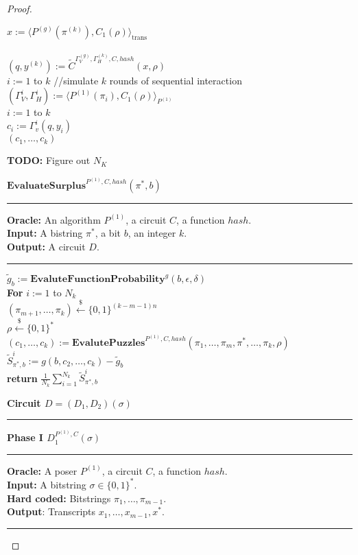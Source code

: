 \begin{proof}
\begin{codeblock}
  \IndI $x := \langle P^{(g)}(\pi^{(k)}), C_1(\rho) \rangle_{\text{trans}}$ \\ \\
  $(q,y^{(k)}) := \widetilde{C}^{\Gamma_V^{(g)}, \Gamma_H^{(k)}, C, hash}(x, \rho)$\\
  \For $i:=1$ to $k$ \Do \IndII //simulate $k$ rounds of sequential interaction \\
  \IndI $(\Gamma_V^{i}, \Gamma_H^{i}) := \langle P^{(1)}(\pi_i), C_1(\rho) \rangle_{P^{(1)}} $\\
  \For $i:=1$ to $k$ \Do \\
  \IndI $c_i := \Gamma_v^{i}(q, y_i)$\\
  \return $(c_1, \dots, c_k)$
\end{codeblock}
%
\begin{todo}
  \textbf{TODO:} Figure out $N_K$\\
\end{todo}
%
\begin{codeblock}
  $\textbf{EvaluateSurplus}^{P^{(1)}, C, hash}(\pi^*, b)$
  \medskip
  \hrule
  \medskip
  \textbf{Oracle:} An algorithm $P^{(1)}$, a circuit $C$, a function $hash$.\\
  \textbf{Input:} A bistring $\pi^*$, a bit $b$, an integer $k$.\\
  \textbf{Output:} A circuit $D$.
  \medskip\hrule\medskip
  $\widetilde{g}_b := \textbf{EvaluteFunctionProbability}^{g}(b, \epsilon, \delta)$ \\
  \textbf{For} $i:=1$ to $N_k$ \Do \\
  \IndI $(\pi_{m+1}, \dots, \pi_k) \xleftarrow{\$} \{0,1\}^{(k-m-1)n}$\\
  \IndI $\rho \xleftarrow{\$} \{0,1\}^{*}$\\
  \IndI $(c_1, \dots, c_k) := \textbf{EvalutePuzzles}^{P^{(1)}, C, hash}(\pi_1, \dots, \pi_{m}, \pi^*, \dots, \pi_k, \rho)$\\
  \IndI $\widetilde{S}_{\pi^*,b}^i := g(b, c_2, \dots, c_k) - \widetilde{g}_b $\\
  \textbf{return} $\frac{1}{N_k} \sum_{i=1}^{N_k} \widetilde{S}_{\pi^*,b}^i$\\
\end{codeblock}
%
\begin{codeblock}
  \textbf{Circuit $D = (D_1, D_2) (\sigma)$}
  \medskip \hrule \medskip
  \textbf{Phase I $D_1^{P^{(1)}, C}(\sigma)$}
  \medskip \hrule \medskip
  \textbf{Oracle:} A poser $P^{(1)}$, a circuit $C$, a function $hash$.\\
  \textbf{Input:} A bitstring $\sigma \in \{0,1\}^{*}$.\\
  \textbf{Hard coded:} Bitstrings $\pi_1, \dots, \pi_{m-1}$. \\
  \textbf{Output}: Transcripts $x_1, \dots, x_{m-1}, x^*$.
  \medskip\hrule\medskip


\end{codeblock}
\end{proof}
